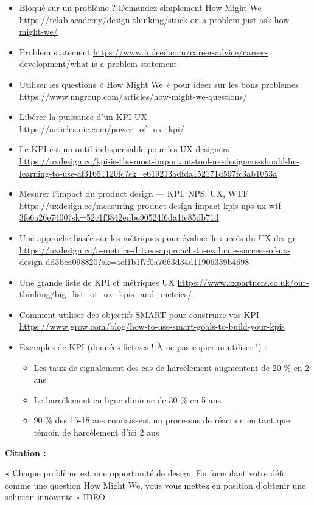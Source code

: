 \begin{itemize}
\item Bloqué sur un problème ? Demandez simplement How Might We \url{https://relab.academy/design-thinking/stuck-on-a-problem-just-ask-how-might-we/}
\item Problem statement \url{https://www.indeed.com/career-advice/career-development/what-is-a-problem-statement}
\item Utiliser les questions « How Might We » pour idéer sur les bons problèmes \url{https://www.nngroup.com/articles/how-might-we-questions/}
\item Libérer la puissance d'un KPI UX \url{https://articles.uie.com/power_of_ux_kpi/}
\item Le KPI est un outil indispensable pour les UX designers \url{https://uxdesign.cc/kpi-is-the-most-important-tool-ux-designers-should-be-learning-to-use-af31651120fc?sk=e619213adfda152171d597fc3ab1053a}
\item Mesurer l'impact du product design  ---  KPI, NPS, UX, WTF \url{https://uxdesign.cc/measuring-product-design-impact-kpis-nps-ux-wtf-3fe6a26e7400?sk=52c1f3842edbe90524f6da1fe85db71d}
\item Une approche basée sur les métriques pour évaluer le succès du UX design \url{https://uxdesign.cc/a-metrics-driven-approach-to-evaluate-success-of-ux-design-dd3bea098820?sk=acf1b1f7f0a7663d34d11906339b4698}
\item Une grande liste de KPI et métriques UX \url{https://www.cxpartners.co.uk/our-thinking/big_list_of_ux_kpis_and_metrics/}
\item Comment utiliser des objectifs SMART pour construire vos KPI \url{https://www.grow.com/blog/how-to-use-smart-goals-to-build-your-kpis}
\item Exemples de KPI (données fictives ! À ne pas copier ni utiliser !) :
\begin{itemize}
\item Les taux de signalement des cas de harcèlement augmentent de 20 \% en 2 ans
\item Le harcèlement en ligne diminue de 30 \% en 5 ans
\item 90 \% des 15-18 ans connaissent un processus de réaction en tant que témoin de harcèlement d'ici 2 ans
\end{itemize}
\end{itemize}

\textbf{Citation :}

« Chaque problème est une opportunité de design. En formulant votre défi comme une question How Might We, vous vous mettez en position d'obtenir une solution innovante » IDEO

